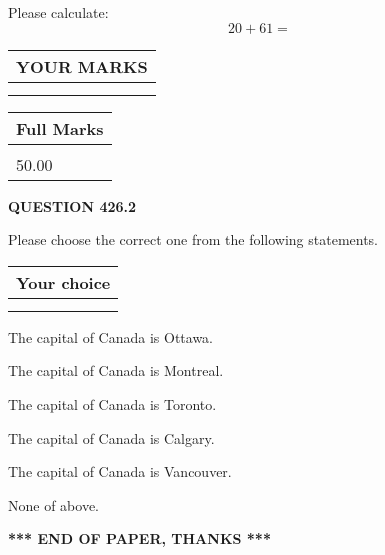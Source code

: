 \documentclass[12pt]{article}
\begin{document}
  
 
Please calculate:
\begin{equation}
20 +  %
61 = \nonumber
\end{equation}
 

 

 
  
\vspace{0.2in}
  
\noindent\begin{tabular}{|l|}
\hline
 YOUR MARKS  \\
\hline
 \\ 
 \\ 
\hline
\end{tabular}
\hspace{0.05in} \begin{tabular}{|l|}
\hline
 Full Marks  \\
\hline
 \\ 
50.00 \\
\hline
\end{tabular}
{\textbf{\Large{QUESTION
426.2 
}}}
  
  
Please choose the correct one from the following statements.
  
  
\noindent\hspace{3.0in} \begin{tabular}{|l|}
\hline
Your choice \\
\hline
 \\ 
 \\ 
\hline
\end{tabular}
  
  
 
 
The capital of Canada is Ottawa.
 
 
The capital of Canada is Montreal.
 
 
The capital of Canada is Toronto.
 
 
The capital of Canada is Calgary.
 
 
The capital of Canada is Vancouver.
 
 
 None of above.
 
 
   
   
 \vspace{0.2in}
 
   
   
   
   
\vspace{1.0in} 
{\textbf{\large{ *** END OF PAPER, THANKS *** }}} 
   
\end{document}
